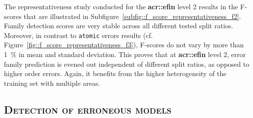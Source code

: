         The representativeness study conducted for the \textbf{\gls{acr::efin}} level 2 results in the F-scores that are illustrated in Subfigure~\ref{subfig::f_score_representativeness_f2}.
        Family detection scores are very stable across all different tested split ratios.
        Moreover, in contrast to \texttt{atomic} errors results (cf. Figure~\ref{fig::f_score_representativeness_f3}), F-scores do not vary by more than \SI{1}{\percent} in mean and standard deviation.
        This proves that at \textbf{\gls{acr::efin}} level 2, error family prediction is evened out independent of different split ratios, as opposed to higher order errors.
        Again, it benefits from the higher heterogeneity of the training set with multiple areas.
    
    \subsection{\textsc{Detection of erroneous models}}
        \label{subsec::more_experiments::finesse::1}
